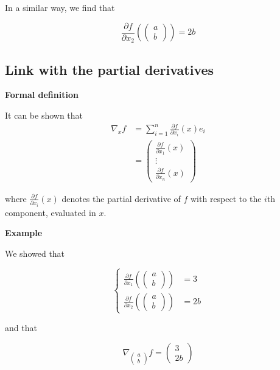 \documentclass{tufte-handout}
\begin{document}
In a similar way, we find that 

$$ \frac{\partial f}{\partial x_2}(\begin{pmatrix}
a \\ b
\end{pmatrix}) = 2b $$

 \subsection{Link with the partial derivatives}
 
 \textbf{Formal definition}
 
 It can be shown that 
 \begin{align*}
  \nabla_x f &= \sum_{i=1}^{n} \frac{\partial f}{\partial x_i}(x) e_i\\
  			&= \begin{pmatrix}
  			\frac{\partial f}{\partial x_1}(x)\\
            \vdots\\
            \frac{\partial f}{\partial x_n}(x)
  			\end{pmatrix}
 \end{align*}

 
 where $ \frac{\partial f}{\partial x_i} (x) $ denotes the partial derivative of $ f $ with respect to the $ i $th component, evaluated in $ x $.
 
 \textbf{Example}
 
 We showed that 
 
$$ \begin{cases}
\frac{\partial f}{\partial x_1}(\begin{pmatrix}
a\\b
\end{pmatrix}) &= 3\\
\frac{\partial f}{\partial x_2}(\begin{pmatrix}
a \\ b
\end{pmatrix}) &= 2b
\end{cases}$$ 

and that 

$$ \nabla_{\begin{pmatrix}
a \\ b
\end{pmatrix}}f = \begin{pmatrix}
3 \\ 2b
\end{pmatrix} $$
\end{document}
